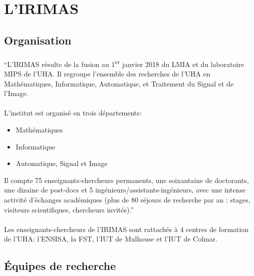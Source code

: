 \documentclass[a4paper,11pt,twoside,french,report]{../common/simplem}
\begin{document}
		\section{L'\acrshort{IRIMAS}}
			\subsection{Organisation}
				\paragraph*{}
					``L'\gls{IRIMAS} résulte de la fusion au 1\textsuperscript{er} janvier 2018 du \gls{LMIA} et du laboratoire \gls{MIPS} de l'\gls{UHA}. Il regroupe l'ensemble des recherches de l'\gls{UHA} en Mathématiques, Informatique, Automatique, et Traitement du Signal et de l'Image.
				\paragraph*{}
					L'institut est organisé en trois départements:
					\begin{itemize}
						\item Mathématiques
						\item Informatique
						\item Automatique, Signal et Image
					\end{itemize}
					Il compte 75 enseignants-chercheurs permanents, une soixantaine de doctorants, une dizaine de post-docs et 5 ingénieurs/assistants-ingénieurs, avec une intense activité d'échanges académiques (plus de 80 séjours de recherche par an : stages, visiteurs scientifiques, chercheurs invités).''~\cite{UHA_IRIMAS}
				\paragraph*{}
					Les enseignants-chercheurs de l'\gls{IRIMAS} sont rattachés à 4 centres de formation de l'\gls{UHA}: l'\gls{ENSISA}, la \gls{FST}, l'\gls{IUT} de Mulhouse et l'\gls{IUT} de Colmar.
			\subsection{Équipes de recherche}
\end{document}
